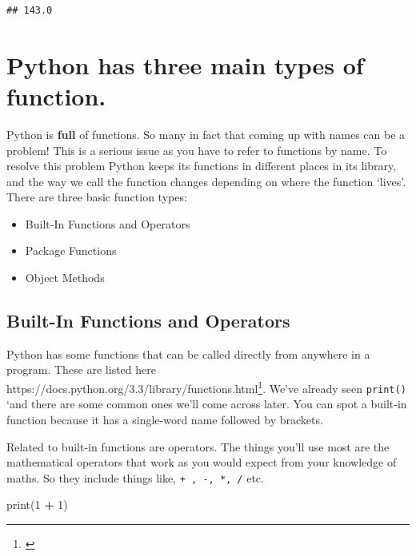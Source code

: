 \documentclass[]{book}
\newenvironment{Shaded}{\begin{snugshade}}{\end{snugshade}}
\newcommand{\BuiltInTok}[1]{#1}
\newcommand{\DecValTok}[1]{\textcolor[rgb]{0.00,0.00,0.81}{#1}}
\newcommand{\NormalTok}[1]{#1}
\newcommand{\OperatorTok}[1]{\textcolor[rgb]{0.81,0.36,0.00}{\textbf{#1}}}
\providecommand{\tightlist}{%
  \setlength{\itemsep}{0pt}\setlength{\parskip}{0pt}}
\let\rmarkdownfootnote\footnote%
\def\footnote{\protect\rmarkdownfootnote}
\renewcommand{\href}[2]{#2\footnote{\url{#1}}}
\theoremstyle{definition}
\theoremstyle{definition}
\theoremstyle{definition}
\theoremstyle{remark}
\begin{document}
\begin{verbatim}
## 143.0
\end{verbatim}

\hypertarget{python-has-three-main-types-of-function.}{%
\section{Python has three main types of
function.}\label{python-has-three-main-types-of-function.}}

Python is \textbf{full} of functions. So many in fact that coming up
with names can be a problem! This is a serious issue as you have to
refer to functions by name. To resolve this problem Python keeps its
functions in different places in its library, and the way we call the
function changes depending on where the function `lives'. There are
three basic function types:

\begin{itemize}
\tightlist
\item
  Built-In Functions and Operators
\item
  Package Functions
\item
  Object Methods
\end{itemize}

\hypertarget{built-in-functions-and-operators}{%
\subsection{Built-In Functions and
Operators}\label{built-in-functions-and-operators}}

Python has some functions that can be called directly from anywhere in a
program. These are listed here
\href{}{https://docs.python.org/3.3/library/functions.html}. We've
already seen \texttt{print()} `and there are some common ones we'll come
across later. You can spot a built-in function because it has a
single-word name followed by brackets.

Related to built-in functions are operators. The things you'll use most
are the mathematical operators that work as you would expect from your
knowledge of maths. So they include things like,
\texttt{+\ ,\ -,\ *,\ /} etc.

\begin{Shaded}
\begin{Highlighting}[]
\BuiltInTok{print}\NormalTok{(}\DecValTok{1} \OperatorTok{+} \DecValTok{1}\NormalTok{)}
\end{Highlighting}
\end{Shaded}
\end{document}
